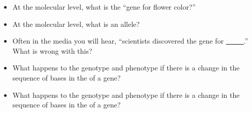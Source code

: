 \begin{frame}[t]
    \begin{adjustwidth}{-1.5em}{-1.5em}
        \begin{itemize}
            \item At the molecular level, what is the ``gene for flower
                color?''


                \vspace{8mm}
            \item At the molecular level, what is an allele?


                \vspace{1.2cm}
            \item Often in the media you will hear, ``scientists discovered the
                gene for \underline{\ \ \ \ \ }.'' What is wrong with this?

        \end{itemize}
    \end{adjustwidth}
\end{frame}

\begin{frame}[t]
    \begin{adjustwidth}{-1.5em}{-1.5em}
        \begin{itemize}
            \item What happens to the genotype and phenotype if there is a
                change in the sequence of bases in the  of a gene?


                \vspace{8mm}
            \item What happens to the genotype and phenotype if there is a
                change in the sequence of bases in the  of a gene?


        \end{itemize}
    \end{adjustwidth}
\end{frame}


